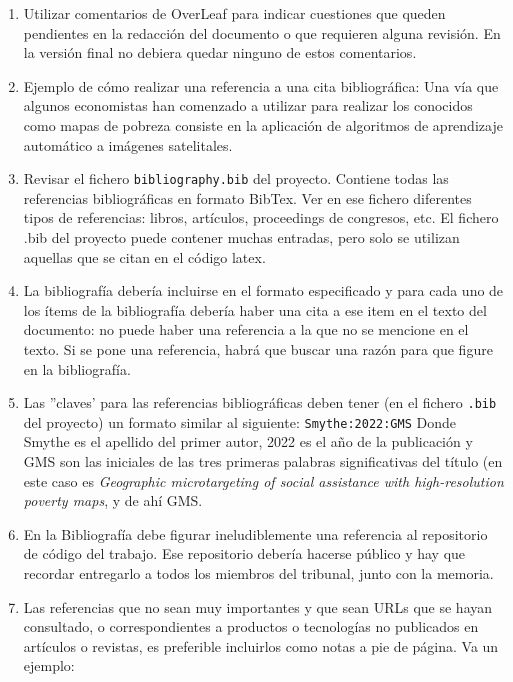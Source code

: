 \begin{enumerate}
\item Utilizar comentarios de OverLeaf para indicar cuestiones que queden pendientes en la redacción del documento o que requieren alguna revisión.
En la versión final no debiera quedar ninguno de estos comentarios.

\item Ejemplo de cómo realizar una referencia a una cita bibliográfica: Una vía que algunos economistas \cite{Smythe:2022:GMS} han comenzado a utilizar para realizar los conocidos como mapas de pobreza consiste en la aplicación de algoritmos de aprendizaje automático a imágenes satelitales.

\item Revisar el fichero \texttt{bibliography.bib} del proyecto. Contiene todas las referencias bibliográficas en formato BibTex.
Ver en ese fichero diferentes tipos de referencias: libros, artículos, proceedings de congresos, etc.
El fichero .bib del proyecto puede contener muchas entradas, pero solo se utilizan aquellas que se citan en el código latex.

\item La bibliografía debería incluirse en el formato especificado y para cada uno de los ítems de la bibliografía debería haber una cita a ese item en el texto del documento: no puede haber una referencia a la que no se mencione en el texto. Si se pone una referencia, habrá que buscar una razón para que figure en la bibliografía.

\item Las ''claves' para las referencias bibliográficas deben tener (en el fichero \texttt{.bib} del proyecto) un formato similar al siguiente: \texttt{Smythe:2022:GMS}
Donde Smythe es el apellido del primer autor, 2022 es el año de la publicación y GMS son las iniciales de las tres primeras palabras significativas del título (en este caso es \textit{Geographic microtargeting of social assistance with high-resolution poverty maps}, y de ahí GMS.

\item En la Bibliografía debe figurar ineludiblemente una referencia \cite{URL::TFG} al repositorio de código del trabajo. Ese repositorio debería hacerse público y hay que recordar entregarlo a todos los miembros del tribunal, junto con la memoria.

\item Las referencias que no sean muy importantes y que sean URLs que se hayan consultado, o correspondientes a productos o tecnologías no publicados en artículos o revistas, es preferible incluirlos como notas a pie de página. Va un ejemplo: 


\end{enumerate}
